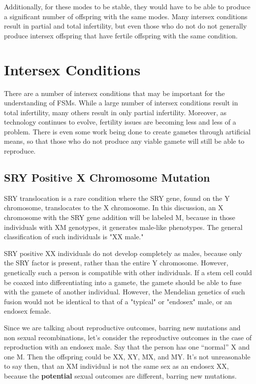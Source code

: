\documentclass{article}
\begin{document}
Additionally, for these modes to be stable, they would have to be able to produce a significant number of offspring with the same modes. Many intersex conditions result in partial and total infertility, but even those who do not do not generally produce intersex offspring that have fertile offspring with the same condition. 
\section{Intersex Conditions}
There are a number of intersex conditions that may be important for the understanding of FSMs. While a large number of intersex conditions result in total infertility, many others result in only partial infertility. Moreover, as technology continues to evolve, fertility issues are becoming less and less of a problem. There is even some work being done to create gametes through artificial means, so that those who do not produce any viable gamete will still be able to reproduce. 
\subsection{SRY Positive X Chromosome Mutation}
SRY translocation is a rare condition where the SRY gene, found on the Y chromosome, translocates to the X chromosome. In this discussion, an X chromosome with the SRY gene addition will be labeled M, because in those individuals with XM genotypes, it generates male-like phenotypes. The general classification of such individuals is "XX male." 

SRY positive XX individuals do not develop completely as males, because only the SRY factor is present, rather than the entire Y chromosome. However, genetically such a person is compatible with other individuals. If a stem cell could be coaxed into differentiating into a gamete, the gamete should be able to fuse with the gamete of another individual. However, the Mendelian genetics of such fusion would not be identical to that of a "typical" or "endosex" male, or an endosex female. 

Since we are talking about reproductive outcomes, barring new mutations and non sexual recombinations, let’s consider the reproductive outcomes in the case of reproduction with an endosex male. Say that the person has one “normal” X and one M. Then the offspring could be XX, XY, MX, and MY. It’s not unreasonable to say then, that an XM individual is not the same sex as an endosex XX, because the \textbf{potential} sexual outcomes are different, barring new mutations. 
\end{document}
